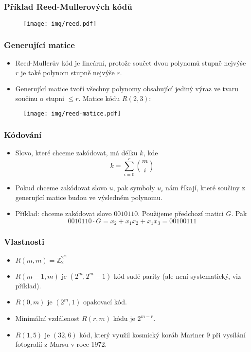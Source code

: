 \documentclass{beamer}
\newcommand{\cela}{\mathbb{Z}}
\newenvironment{itemizex}%
  {\large \begin{itemize}%
    \setlength{\itemsep}{8pt}%
    \setlength{\parskip}{8pt}}%
  {\end{itemize}}
\begin{document}
\begin{frame}[t,fragile]\frametitle{Příklad Reed-Mullerových kódů} 
\begin{figure}[htb]
    \centering
    \texttt{[image: img/reed.pdf]}
\end{figure}
\end{frame}



\begin{frame}[t,fragile]\frametitle{Generující matice} 
    \begin{itemizex}
        \item Reed-Mullerův kód je lineární, protože součet dvou polynomů stupně nejvýše $r$ je také polynom stupně nejvýše $r$.
        \item Generující matice tvoří všechny polynomy obsahující jediný výraz ve tvaru součinu o stupni $\le r$. Matice kódu $R(2,3)$:
    \end{itemizex}

\begin{figure}[htb]
    \centering
    \texttt{[image: img/reed-matice.pdf]}
\end{figure}
\end{frame}


\begin{frame}[t,fragile]\frametitle{Kódování} 
    \begin{itemizex}
        \item Slovo, které chceme zakódovat, má délku $k$, kde
        $$
k=\sum_{i=0}^r{m\choose i}
        $$
        \item Pokud chceme zakódovat slovo $u$, pak symboly $u_i$ nám říkají, které součiny z generující matice budou ve výsledném polynomu.
        \item Příklad: chceme zakódovat slovo $0010110$. Použijeme předchozí matici $G$. Pak 
        $$
0010110\cdot G=x_2+x_1x_2+x_1x_3=00100111     
        $$
    \end{itemizex}
\end{frame}


\begin{frame}[t,fragile]\frametitle{Vlastnosti} 
    \begin{itemizex}
        \item $R(m,m)=\cela_2^{2^m}$
        \item $R(m-1,m)$ je $(2^m,2^m-1)$ kód sudé parity (ale není systematický, viz příklad).
        \item $R(0, m)$ je $(2^m,1)$ opakovací kód. 
        \item Minimální vzdálenost $R(r,m)$ kódu je $2^{m-r}$.
        \item $R(1,5)$ je $(32,6)$ kód, který využil kosmický koráb Mariner 9 při vysílání fotografií z Marsu v roce 1972.
    \end{itemizex}
\end{frame}
\end{document}
